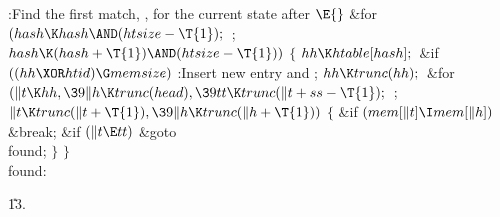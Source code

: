 \Y\B\4:Find the first match, , for the current state after \X${}\E{}$\6
\&{for} ${}(\\{hash}\K\\{hash}\AND(\\{htsize}-\T{1});{}$  ; ${}\\{hash}\K(%
\\{hash}+\T{1})\AND(\\{htsize}-\T{1})){}$\5
${}\{{}$\1\6
${}\\{hh}\K\\{htable}[\\{hash}];{}$\6
\&{if} ${}((\\{hh}\XOR\\{htid})\G\\{memsize}){}$\1\5
:Insert new entry and \X;\2\6
${}\\{hh}\K\\{trunc}(\\{hh});{}$\6
\&{for} ${}(\|t\K\\{hh},\39\|h\K\\{trunc}(\\{head}),\39\\{tt}\K\\{trunc}(\|t+%
\\{ss}-\T{1});{}$  ; ${}\|t\K\\{trunc}(\|t+\T{1}),\39\|h\K\\{trunc}(\|h+%
\T{1})){}$\5
${}\{{}$\1\6
\&{if} ${}(\\{mem}[\|t]\I\\{mem}[\|h]){}$\1\5
\&{break};\2\6
\&{if} ${}(\|t\E\\{tt}){}$\1\5
\&{goto} \\{found};\2\6
\4${}\}{}$\2\6
\4${}\}{}$\2\6
\\{found}:\par
\U13\*.\fi


